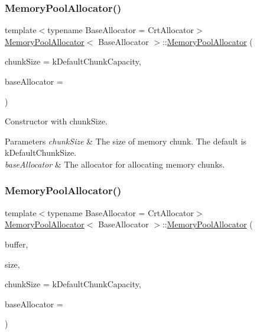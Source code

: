 \subsubsection{\texorpdfstring{Memory\+Pool\+Allocator()}{MemoryPoolAllocator()}\hspace{0.1cm}{\footnotesize\ttfamily [1/2]}}
{\footnotesize\ttfamily template$<$typename Base\+Allocator = Crt\+Allocator$>$ \\
\hyperlink{class_memory_pool_allocator}{Memory\+Pool\+Allocator}$<$ Base\+Allocator $>$\+::\hyperlink{class_memory_pool_allocator}{Memory\+Pool\+Allocator} (\begin{DoxyParamCaption}\item[{size\+\_\+t}]{chunk\+Size = {\ttfamily kDefaultChunkCapacity},  }\item[{Base\+Allocator $\ast$}]{base\+Allocator = {} }\end{DoxyParamCaption})\hspace{0.3cm}{\ttfamily [inline]}}



Constructor with chunk\+Size. 


\begin{DoxyParams}{Parameters}
{\em chunk\+Size} & The size of memory chunk. The default is k\+Default\+Chunk\+Size. \\
\hline
{\em base\+Allocator} & The allocator for allocating memory chunks. \\
\hline
\end{DoxyParams}
\mbox{\label{class_memory_pool_allocator_a1f0d865093fdb955d956b7a445a8ddbf}} 
\subsubsection{\texorpdfstring{Memory\+Pool\+Allocator()}{MemoryPoolAllocator()}\hspace{0.1cm}{\footnotesize\ttfamily [2/2]}}
{\footnotesize\ttfamily template$<$typename Base\+Allocator = Crt\+Allocator$>$ \\
\hyperlink{class_memory_pool_allocator}{Memory\+Pool\+Allocator}$<$ Base\+Allocator $>$\+::\hyperlink{class_memory_pool_allocator}{Memory\+Pool\+Allocator} (\begin{DoxyParamCaption}\item[{void $\ast$}]{buffer,  }\item[{size\+\_\+t}]{size,  }\item[{size\+\_\+t}]{chunk\+Size = {\ttfamily kDefaultChunkCapacity},  }\item[{Base\+Allocator $\ast$}]{base\+Allocator = {} }\end{DoxyParamCaption})\hspace{0.3cm}{\ttfamily [inline]}}



